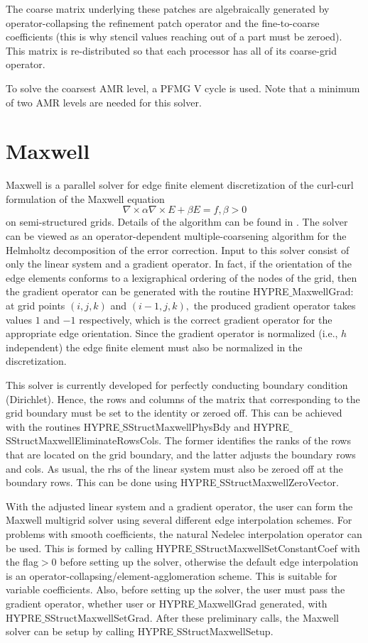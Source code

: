 The coarse matrix underlying these patches are algebraically generated by operator-collapsing the 
refinement patch operator and the fine-to-coarse coefficients (this is why stencil values reaching
out of a part must be zeroed). This matrix is re-distributed so that each processor has all of its
coarse-grid operator.

To solve the coarsest AMR level, a PFMG V cycle is used. Note that a minimum of two AMR levels
are needed for this solver.


\section{Maxwell}

Maxwell is a parallel solver for edge finite element discretization of the
curl-curl formulation of the Maxwell equation
\[ \nabla \times \alpha \nabla \times E + \beta E= f, \beta> 0\]
on semi-structured grids. Details of the algorithm can be found in \cite{JonesLee_2006}.
The solver can be viewed as an operator-dependent multiple-coarsening algorithm for the Helmholtz
decomposition of the error correction. Input to this solver consist of only the linear system
and a gradient operator. In fact, if the orientation of the edge elements conforms to
a lexigraphical ordering of the nodes of the grid, then the gradient operator can be generated
with the routine HYPRE$\_$MaxwellGrad: at grid points $(i,j,k)$ and $(i-1,j,k),$
the produced gradient operator takes values $1$ and $-1$ respectively, which
is the correct gradient operator for the appropriate edge orientation. Since the gradient operator
is normalized (i.e., $h$ independent) the edge finite element must also be normalized in the
discretization.

This solver is currently developed for perfectly conducting boundary condition (Dirichlet). Hence, the
rows and columns of the matrix that corresponding to the grid boundary must be set to the identity or
zeroed off. This can be achieved with the routines HYPRE$\_$SStructMaxwellPhysBdy and 
HYPRE$\_$SStructMaxwellEliminateRowsCols. The former identifies the ranks of the rows that are located on
the grid boundary, and the latter adjusts the boundary rows and cols. As usual, the rhs of the linear system
must also be zeroed off at the boundary rows. This can be done using HYPRE$\_$SStructMaxwellZeroVector.

With the adjusted linear system and a gradient operator, the user can form the Maxwell multigrid solver using 
several different edge interpolation schemes. For problems with smooth coefficients, the natural Nedelec
interpolation operator can be used. This is formed by calling HYPRE$\_$SStructMaxwellSetConstantCoef 
with the flag$>0$ before setting up the solver, otherwise the default edge interpolation is an
operator-collapsing/element-agglomeration scheme. This is suitable for variable coefficients.
Also, before setting up the solver, the user must pass the gradient operator, whether user or 
HYPRE$\_$MaxwellGrad generated, with HYPRE$\_$SStructMaxwellSetGrad. After these
preliminary calls, the Maxwell solver can be setup by calling HYPRE$\_$SStructMaxwellSetup.

